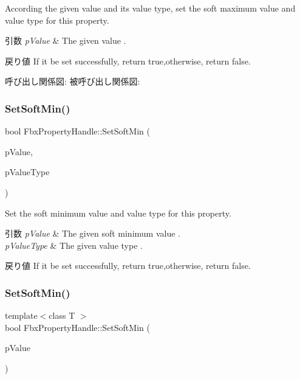 According the given value and its value type, set the soft maximum value and value type for this property. 
\begin{DoxyParams}{引数}
{\em p\+Value} & The given value . \\
\hline
\end{DoxyParams}
\begin{DoxyReturn}{戻り値}
If it be set successfully, return true,otherwise, return false. 
\end{DoxyReturn}
呼び出し関係図\+:
被呼び出し関係図\+:
\mbox{\label{class_fbx_property_handle_af70fa8b28c77e394928d4e1e7cabe50d}} 
\subsubsection{\texorpdfstring{Set\+Soft\+Min()}{SetSoftMin()}\hspace{0.1cm}{\footnotesize\ttfamily [1/2]}}
{\footnotesize\ttfamily bool Fbx\+Property\+Handle\+::\+Set\+Soft\+Min (\begin{DoxyParamCaption}\item[{const void $\ast$}]{p\+Value,  }\item[{\hyperlink{fbxpropertytypes_8h_a73913a5ddfb20e57c6f25e9e6784bd92}{E\+Fbx\+Type}}]{p\+Value\+Type }\end{DoxyParamCaption})}

Set the soft minimum value and value type for this property. 
\begin{DoxyParams}{引数}
{\em p\+Value} & The given soft minimum value . \\
\hline
{\em p\+Value\+Type} & The given value type . \\
\hline
\end{DoxyParams}
\begin{DoxyReturn}{戻り値}
If it be set successfully, return true,otherwise, return false. 
\end{DoxyReturn}
\mbox{\label{class_fbx_property_handle_a636d40ff360385c71587813842f6d004}} 
\subsubsection{\texorpdfstring{Set\+Soft\+Min()}{SetSoftMin()}\hspace{0.1cm}{\footnotesize\ttfamily [2/2]}}
{\footnotesize\ttfamily template$<$class T $>$ \\
bool Fbx\+Property\+Handle\+::\+Set\+Soft\+Min (\begin{DoxyParamCaption}\item[{const T \&}]{p\+Value }\end{DoxyParamCaption})}

